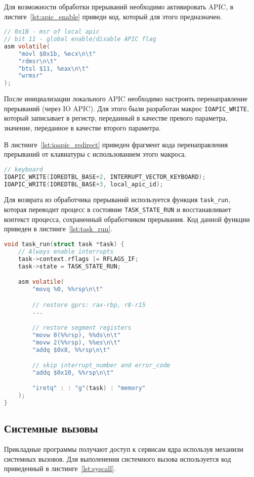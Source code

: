 Для возможности обработки прерываний необходимо активировать APIC,
в листиге~\ref{lst:apic_enable} приведн код, который для этого предназначен.
\begin{lstlisting}[language=C,
caption={Активация локального APIC},
label={lst:apic_enable}]
// 0x1B - msr of local apic
// bit 11 - global enable/disable APIC flag
asm volatile(
	"movl $0x1b, %ecx\n\t"
	"rdmsr\n\t"
	"btsl $11, %eax\n\t"
	"wrmsr"
);
\end{lstlisting}

После инициализации локального APIC необходимо настроить перенаправление прерываний (через IO APIC).
Для этого были разработан макрос \texttt{IOAPIC\_WRITE}, который записывает в регистр, переданный
в качестве превого параметра, значение, переданное в качестве второго параметра.

В листинге~\ref{lst:ioapic_redirect} приведен фрагмент кода перенаправления прерываний от клавиатуры
с использованием этого макроса.

\begin{lstlisting}[language=C,
caption={Настройка IOAPIC},
label={lst:ioapic_redirect}]
// keyboard
IOAPIC_WRITE(IOREDTBL_BASE+2, INTERRUPT_VECTOR_KEYBOARD);
IOAPIC_WRITE(IOREDTBL_BASE+3, local_apic_id);
\end{lstlisting}

Для возврата из обработчика прерываний используется функция \texttt{task\_run},
которая переводит процесс в состояние \texttt{TASK\_STATE\_RUN} и восстанавливает
контекст процесса, сохраненный обработчиком прерывания. Код данной функции
приведен в листинге~\ref{lst:task_run}.

\begin{lstlisting}[language=C,
caption={Запуск процесса},
label={lst:task_run}]
void task_run(struct task *task) {
	// Always enable interrupts
	task->context.rflags |= RFLAGS_IF;
	task->state = TASK_STATE_RUN;

	asm volatile(
		"movq %0, %%rsp\n\t"

		// restore gprs: rax-rbp, r8-r15
		...

		// restore segment registers
		"movw 0(%%rsp), %%ds\n\t"
		"movw 2(%%rsp), %%es\n\t"
		"addq $0x8, %%rsp\n\t"

		// skip interrupt_number and error_code
		"addq $0x10, %%rsp\n\t"

		"iretq" : : "g"(task) : "memory"
	);
}
\end{lstlisting}


\subsection{Системные вызовы}
Прикладные программы получают доступ к сервисам ядра используя механизм системных
вызовов. Для выполенения системного вызова используется код приведенный в
листинге~\ref{lst:syscall}.

